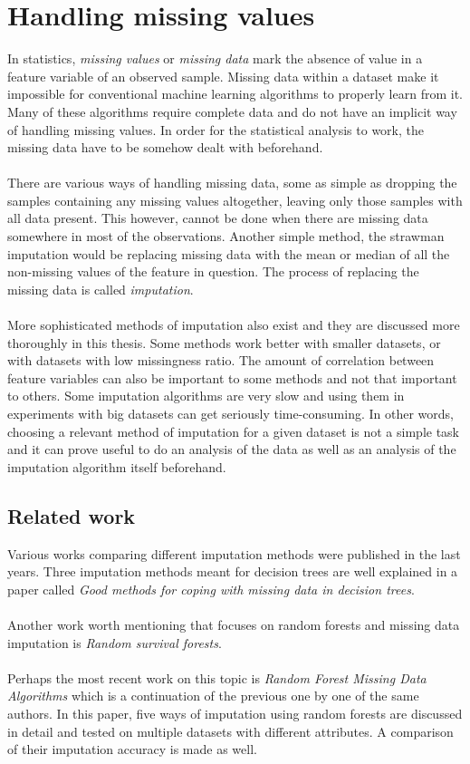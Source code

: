 \documentclass[11pt]{article}
\begin{document}
  \section{Handling missing values}
    In statistics, {\it missing values} or {\it missing data} mark the absence of value in a feature variable of an observed sample. Missing data within a dataset make it impossible for conventional machine learning algorithms to properly learn from it. Many of these algorithms require complete data and do not have an implicit way of handling missing values. In order for the statistical analysis to work, the missing data have to be somehow dealt with beforehand. \citep{otfi}
    \\~\\
    There are various ways of handling missing data, some as simple as dropping the samples containing any missing values altogether, leaving only those samples with all data present. \citep{lwd} This however, cannot be done when there are missing data somewhere in most of the observations. Another simple method, the strawman imputation \citep{otfi} would be replacing missing data with the mean or median of all the non-missing values of the feature in question. The process of replacing the missing data is called {\it imputation}.
    \\~\\
    More sophisticated methods of imputation also exist and they are discussed more thoroughly in this thesis. Some methods work better with smaller datasets, or with datasets with low missingness ratio. The amount of correlation between feature variables can also be important to some methods and not that important to others. \citep{otfi} Some imputation algorithms are very slow and using them in experiments with big datasets can get seriously time-consuming. In other words, choosing a relevant method of imputation for a given dataset is not a simple task and it can prove useful to do an analysis of the data as well as an analysis of the imputation algorithm itself beforehand.
    \subsection{Related work}
      Various works comparing different imputation methods were published in the last years. Three imputation methods meant for decision trees are well explained in a paper called {\it Good methods for coping with missing data in decision trees}. \citep{mia}
      \\~\\
      Another work worth mentioning that focuses on random forests and missing data imputation is {\it Random survival forests}. \citep{rsf}
      \\~\\
      Perhaps the most recent work on this topic is {\it Random Forest Missing Data Algorithms} \citep{otfi} which is a continuation of the previous one by one of the same authors. In this paper, five ways of imputation using random forests are discussed in detail and tested on multiple datasets with different attributes. A comparison of their imputation accuracy is made as well.
    \\~\\
\end{document}

